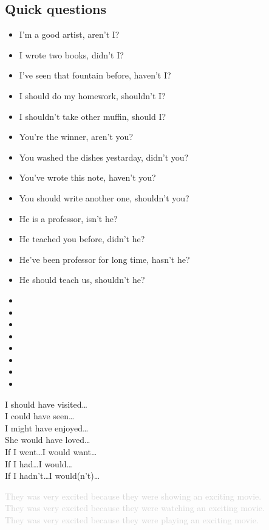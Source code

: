 \subsection{Quick questions}
\begin{multicols}{2}
\begin{itemize}
\item I'm a good artist, aren't I?
\item I wrote two books, didn't I?
\item I've seen that fountain before, haven't I?
\item I should do my homework, shouldn't I?
\item I shouldn't take other muffin, should I?
\item You're the winner, aren't you?
\item You washed the dishes yestarday, didn't you?
\item You've wrote this note, haven't you?
\item You should write another one, shouldn't you?
\item He is a professor, isn't he?
\item He teached you before, didn't he?
\item He've been professor for long time, hasn't he?
\item He should teach us, shouldn't he?
\item 
\item 
\item 
\item 
\item 
\item 
\item 
\item 
\end{itemize}
I should have visited\dots \\
I could have seen\dots \\
I might have enjoyed\dots \\
She would have loved\dots \\
If I went\dots I would want\dots \\
If I had\dots I would\dots \\
If I hadn't\dots I would(n't)\dots \\

\end{multicols}

\textcolor{lightgray}{They was very excited because they were showing an exciting movie.}\\
\textcolor{lightgray}{They was very excited because they were watching an exciting movie.}\\
\textcolor{lightgray}{They was very excited because they were playing an exciting movie.}